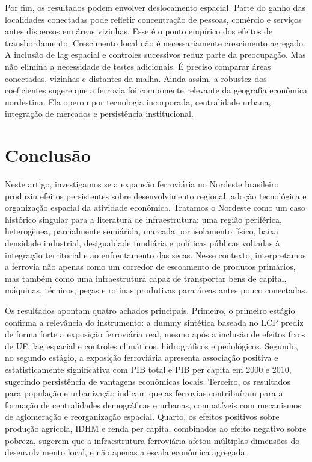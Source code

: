 \documentclass[12pt,a4paper]{article}
\begin{document}
Por fim, os resultados podem envolver deslocamento espacial. Parte do ganho das localidades conectadas pode refletir concentração de pessoas, comércio e serviços antes dispersos em áreas vizinhas. Esse é o ponto empírico dos efeitos de transbordamento. Crescimento local não é necessariamente crescimento agregado. A inclusão de lag espacial e controles sucessivos reduz parte da preocupação. Mas não elimina a necessidade de testes adicionais. É preciso comparar áreas conectadas, vizinhas e distantes da malha. Ainda assim, a robustez dos coeficientes sugere que a ferrovia foi componente relevante da geografia econômica nordestina. Ela operou por tecnologia incorporada, centralidade urbana, integração de mercados e persistência institucional.

\section{Conclusão}

Neste artigo, investigamos se a expansão ferroviária no Nordeste brasileiro produziu efeitos persistentes sobre desenvolvimento regional, adoção tecnológica e organização espacial da atividade econômica. Tratamos o Nordeste como um caso histórico singular para a literatura de infraestrutura: uma região periférica, heterogênea, parcialmente semiárida, marcada por isolamento físico, baixa densidade industrial, desigualdade fundiária e políticas públicas voltadas à integração territorial e ao enfrentamento das secas. Nesse contexto, interpretamos a ferrovia não apenas como um corredor de escoamento de produtos primários, mas também como uma infraestrutura capaz de transportar bens de capital, máquinas, técnicos, peças e rotinas produtivas para áreas antes pouco conectadas.

Os resultados apontam quatro achados principais. Primeiro, o primeiro estágio confirma a relevância do instrumento: a dummy sintética baseada no LCP prediz de forma forte a exposição ferroviária real, mesmo após a inclusão de efeitos fixos de UF, lag espacial e controles climáticos, hidrográficos e pedológicos. Segundo, no segundo estágio, a exposição ferroviária apresenta associação positiva e estatisticamente significativa com PIB total e PIB per capita em 2000 e 2010, sugerindo persistência de vantagens econômicas locais. Terceiro, os resultados para população e urbanização indicam que as ferrovias contribuíram para a formação de centralidades demográficas e urbanas, compatíveis com mecanismos de aglomeração e reorganização espacial. Quarto, os efeitos positivos sobre produção agrícola, IDHM e renda per capita, combinados ao efeito negativo sobre pobreza, sugerem que a infraestrutura ferroviária afetou múltiplas dimensões do desenvolvimento local, e não apenas a escala econômica agregada.
\end{document}
